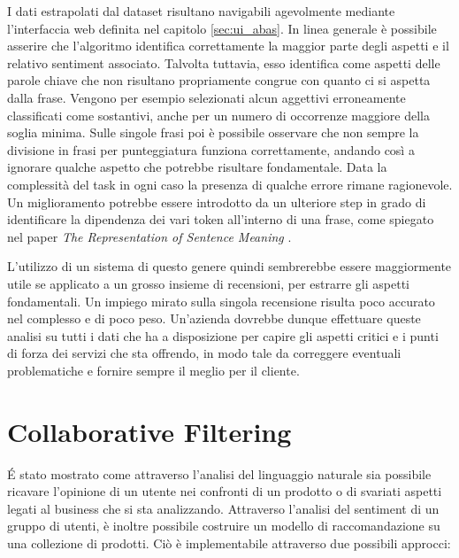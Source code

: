\documentclass[hidelinks, 12pt]{article}
\begin{document}
I dati estrapolati dal dataset risultano navigabili agevolmente mediante l'interfaccia web definita nel capitolo \ref{sec:ui_abas}. In linea generale è possibile asserire che l'algoritmo identifica correttamente la maggior parte degli aspetti e il relativo sentiment associato. Talvolta tuttavia, esso identifica come aspetti delle parole chiave che non risultano propriamente congrue con quanto ci si aspetta dalla frase. Vengono per esempio selezionati alcun aggettivi erroneamente classificati come sostantivi, anche per un numero di occorrenze maggiore della soglia minima. Sulle singole frasi poi è possibile osservare che non sempre la divisione in frasi per punteggiatura funziona correttamente, andando così a ignorare qualche aspetto che potrebbe risultare fondamentale. Data la complessità del task in ogni caso la presenza di qualche errore rimane ragionevole. Un miglioramento potrebbe essere introdotto da un ulteriore step in grado di identificare la dipendenza dei vari token all'interno di una frase, come spiegato nel paper {\it The Representation of Sentence Meaning} \cite{site:the_representation_of_sentence_meaning}.

L'utilizzo di un sistema di questo genere quindi sembrerebbe essere maggiormente utile se applicato a un grosso insieme di recensioni, per estrarre gli aspetti fondamentali. Un impiego mirato sulla singola recensione risulta poco accurato nel complesso e di poco peso. Un'azienda dovrebbe dunque effettuare queste analisi su tutti i dati che ha a disposizione per capire gli aspetti critici e i punti di forza dei servizi che sta offrendo, in modo tale da correggere eventuali problematiche e fornire sempre il meglio per il cliente.


\clearpage



\section{Collaborative Filtering}


É stato mostrato come attraverso l'analisi del linguaggio naturale sia possibile ricavare l'opinione di un utente nei confronti di un prodotto o di svariati aspetti legati al business che si sta analizzando. Attraverso l'analisi del sentiment di un gruppo di utenti, è inoltre possibile costruire un modello di raccomandazione su una collezione di prodotti. Ciò è implementabile attraverso due possibili approcci:
\end{document}
